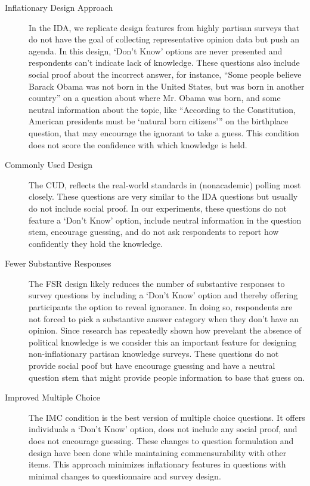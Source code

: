 \documentclass[12pt, letterpaper]{article}
\begin{document}
\begin{description}
  \item[Inflationary Design Approach] \label{txt:IDA} In the IDA, we replicate design features from highly partisan surveys that do not have the goal of collecting representative opinion data but push an agenda. In this design, `Don't Know' options are never presented and respondents can't indicate lack of knowledge. These questions also include social proof  about the incorrect answer, for instance, ``Some people believe Barack Obama was not born in the United States, but was born in another country'' on a question about where Mr. Obama was born, and some neutral information about the topic, like ``According to the Constitution, American presidents must be `natural born citizens''' on the birthplace question, that may encourage the ignorant to take a guess.  This condition does not score the confidence with which knowledge is held.
  \item[Commonly Used Design] \label{txt:CUD} The CUD, reflects the real-world standards in (nonacademic) polling most closely. These questions are very similar to the IDA questions but usually do not include social proof. In our experiments, these questions do not feature a `Don't Know' option, include neutral information in the question stem, encourage guessing, and do not ask respondents to report how confidently they hold the knowledge.
  \item[Fewer Substantive Responses] \label{txt:FSR} The FSR design likely reduces the number of substantive responses to survey questions by including a `Don't Know' option and thereby offering participants the option to reveal ignorance. In doing so, respondents are not forced to pick a substantive answer category when they don't have an opinion. Since research has repeatedly shown how prevelant the absence of political knowledge is we consider this an important feature for designing non-inflationary partisan knowledge surveys. These questions do not provide social poof but have encourage guessing and have a neutral question stem that might provide people information to base that guess on.
  \item[Improved Multiple Choice] \label{txt:IMC} The IMC condition is the best version of multiple choice questions. It offers individuals a `Don't Know' option, does not include any social proof, and does not encourage guessing. These changes to question formulation and design have been done while maintaining commensurability with other items. This approach minimizes inflationary features in questions with minimal changes to questionnaire and survey design.
\end{description}
\end{document}
